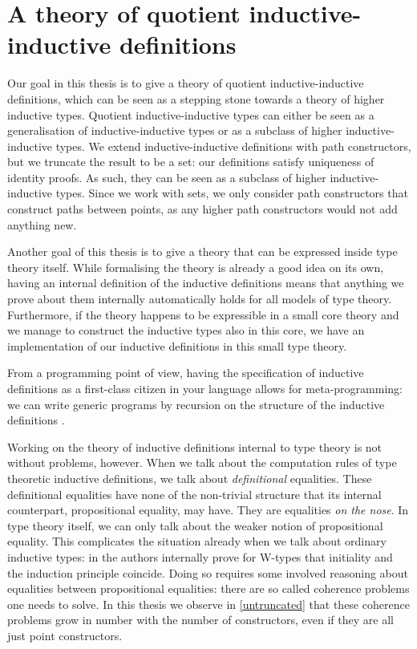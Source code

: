 \section{A theory of quotient inductive-inductive definitions}

Our goal in this thesis is to give a theory of quotient
inductive-inductive definitions, which can be seen as a stepping stone
towards a theory of higher inductive types. Quotient
inductive-inductive types can either be seen as a generalisation of
inductive-inductive types or as a subclass of higher
inductive-inductive types. We extend inductive-inductive definitions
with path constructors, but we truncate the result to be a set: our
definitions satisfy uniqueness of identity proofs. As such, they can
be seen as a subclass of higher inductive-inductive types. Since we
work with sets, we only consider path constructors that construct
paths between points, as any higher path constructors would not add
anything new.

Another goal of this thesis is to give a theory that can be expressed
inside type theory itself. While formalising the theory is already a
good idea on its own, having an internal definition of the inductive
definitions means that anything we prove about them internally
automatically holds for all models of type theory. Furthermore, if the
theory happens to be expressible in a small core theory and we manage
to construct the inductive types also in this core, we have an
implementation of our inductive definitions in this small type theory.

From a programming point of view, having the specification of
inductive definitions as a first-class citizen in your language allows
for meta-programming: we can write generic programs by recursion on
the structure of the inductive definitions \cite{Benke2003}.

Working on the theory of inductive definitions internal to type theory
is not without problems, however. When we talk about the computation
rules of type theoretic inductive definitions, we talk about
\emph{definitional} equalities. These definitional equalities have
none of the non-trivial structure that its internal counterpart,
propositional equality, may have. They are equalities \emph{on the
  nose}. In type theory itself, we can only talk about the weaker
notion of propositional equality. This complicates the situation
already when we talk about ordinary inductive types: in
\cite{Awodey2012} the authors internally prove for W-types that
initiality and the induction principle coincide. Doing so requires
some involved reasoning about equalities between propositional
equalities: there are so called coherence problems one needs to
solve. In this thesis we observe in \cref{untruncated} that these
coherence problems grow in number with the number of constructors,
even if they are all just point constructors.


